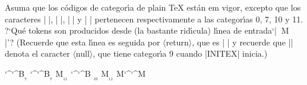 

\bigskip

\enunciadoS Asuma que los c\'odigos de categor\'{\i}a de plain {\TeX}
est\'an em vigor, excepto que los caracteres |^^A|, |^^B|, |^^C| y
|^^M| pertenecen respectivamente a las categor\'{\i}as 0, 7, 10 y
11. ?`Qu\'e tokens son producidos desde (la bastante rid\'{\i}cula)
l\'{\i}nea de entrada`|^^B^^BM^^A^^B^^C^^M^^@\M|\literalblanco'?
(Recuerde que esta l\'{\i}nea es seguida por $\langle$return$\rangle$,
que es |^^M| y recuerde que |^^@| denota el caracter
$\langle$null$\rangle$, que tiene categor\'{\i}a 9 cuando |INITEX|
inicia.)

\bigskip

\respuestaS

\char`^\char`^B$_{_7}$ %
\char`^\char`^B$_{_7}$ %
M$_{_{11}}$ %
\char`^\char`^B %
\literalblanco$_{_{10}}$ %
M$_{_{11}}$ %
M\char`^\char`^M %

\bye

